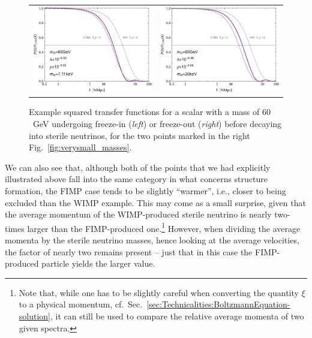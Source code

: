 \begin{figure}[t]
\begin{tabular}{lr}\hspace{-1cm}
 \includegraphics[width=8.3cm]{figures/SquaredTF_mS_60_FIMP.pdf} & \includegraphics[width=8.3cm]{figures/SquaredTF_mS_60_WIMP.pdf}
\end{tabular}
\caption{\label{fig:TF_60}Example squared transfer functions for a scalar with a mass of $60$~GeV undergoing freeze-in (\emph{left}) or freeze-out (\emph{right}) before decaying into sterile neutrinos, for the two points marked in the right Fig.~\ref{fig:verysmall_masses}.}
\end{figure}

We can also see that, although both of the points that we had explicitly illustrated above fall into the same category in what concerns structure formation, the FIMP case tends to be slightly ``warmer'', i.e., closer to being excluded than the WIMP example. This may come as a small surprise, given that the average momentum of the WIMP-produced sterile neutrino is nearly two-times larger than the FIMP-produced one.\footnote{Note that, while one has to be slightly careful when converting the quantity $\xi$ to a physical momentum, cf.\ Sec.~\ref{sec:Technicalities:BoltzmannEquation-solution}, it can still be used to compare the relative average momenta of two given spectra.} However, when dividing the average momenta by the sterile neutrino masses, hence looking at the average velocities, the factor of nearly two remains present -- just that in this case the FIMP-produced particle yields the larger value.

